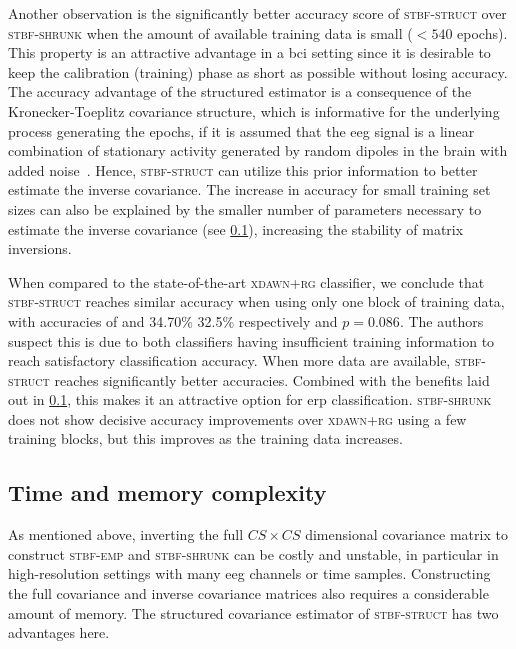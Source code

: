 	Another observation is the significantly better accuracy score of
	\textsc{stbf-struct} over \textsc{stbf-shrunk} when the amount of available
  training data is small ($<540$ epochs).
	This property is an attractive advantage in a \ac{bci} setting since it is desirable to keep the calibration (training) phase as short as possible without losing accuracy.
	The accuracy advantage of the structured estimator is a consequence of the
	Kronecker-Toeplitz covariance structure, which is informative for the
	underlying process generating the epochs, if it is assumed that the \ac{eeg} signal
	is a linear combination of stationary activity generated by random dipoles in
	the brain with added noise~\cite{Munck1992, DeMunck2002, GonzalezNavarro2017}.
	Hence, \textsc{stbf-struct} can utilize this prior information to better estimate the inverse
	covariance.
  The increase in accuracy for small training set sizes can also be explained by the smaller number of parameters necessary to estimate the inverse covariance (see \cref{sec:stbf-struct/discussion/param-complex}), increasing the stability of matrix inversions.

	When compared to the state-of-the-art \textsc{xdawn+rg} classifier, we conclude
	that \textsc{stbf-struct} reaches similar accuracy when using only one block of
  training data, with accuracies of and 34.70\% 32.5\% respectively and $p=0.086$.
	The authors suspect this is due to both	classifiers having insufficient training
  information to reach satisfactory classification accuracy.
	When more data are available, \textsc{stbf-struct} reaches significantly
  better accuracies.
	Combined with the benefits laid out in \cref{sec:stbf-struct/discussion/param-complex}, this
  makes it an attractive option for \ac{erp} classification.
	\textsc{stbf-shrunk} does not show decisive accuracy improvements over
	\textsc{xdawn+rg} using a few training blocks, but this improves as the
  training data increases.

	\subsection{Time and memory complexity}
	\label{sec:stbf-struct/discussion/param-complex}
	As mentioned above, inverting the full $CS \times CS$ dimensional covariance
	matrix to construct \textsc{stbf-emp} and \textsc{stbf-shrunk} can be costly
	and unstable, in particular in high-resolution settings with many \ac{eeg} channels or time samples.
	Constructing the full covariance and inverse covariance matrices also requires a considerable amount of memory.
	The structured covariance estimator of \textsc{stbf-struct} has two advantages here.

